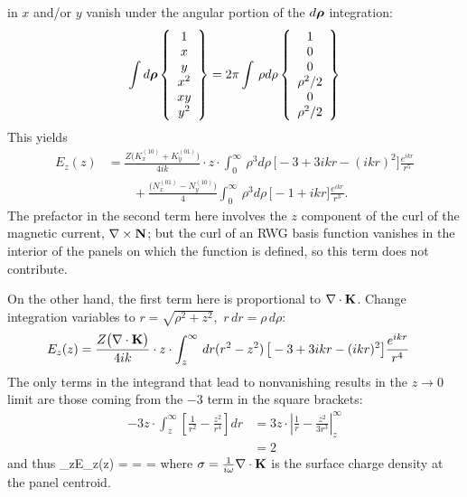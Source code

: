 \documentclass[letterpaper]{article}
\begin{document}
in $x$ and/or $y$ vanish under the angular portion of the $d\boldsymbol{\rho}$
integration:
$$ \int d\boldsymbol{\rho} 
   \left\{ \begin{array}{c} 1 \\ x \\ y \\ x^2 \\xy \\y^2 \end{array}
   \right\}
   =2\pi \int \, \rho d\rho 
   \left\{ \begin{array}{c} 1 \\ 0 \\ 0 \\ \rho^2/2 \\ 0 \\ \rho^2/2 \end{array}
   \right\}
$$
This yields
\begin{align*}
 E_z(z) 
&= \frac{Z \big( K_x^{(10)} + K_y^{(01)} \big)}{4ik}  
   \cdot z \cdot \int_0^\infty \, \rho^3 d\rho \, \big[-3 + 3ikr - (ikr)^2\big] 
   \frac{e^{ikr}}{r^5}
\\
&\qquad
 + \frac{\big( N_x^{(01)} - N_y^{(10)} \big)}{4}  
   \int_0^\infty \, \rho^3 d\rho \, \big[-1 + ikr ] 
   \frac{e^{ikr}}{r^3}.
\end{align*}
The prefactor in the second term here involves the $z$ component of the 
curl of the magnetic current, $\nabla \times \mathbf{N}$; but the curl of an 
RWG basis function vanishes in the interior of the panels on which the 
function is defined, so this term does not contribute.

On the other hand, the first term here is proportional to $\nabla \cdot \mathbf{K}$.
Change integration variables to 
$r=\sqrt{\rho^2 + z^2}, \,\, r\,dr = \rho\, d\rho:$
\begin{align*}
 E_z(z) 
&= \frac{Z \big (\nabla \cdot \mathbf{K} \big)}{4ik} 
   \cdot z \cdot \int_z^\infty \, dr (r^2 - z^2) \, \big[-3 + 3ikr - (ikr)^2\big] 
   \frac{e^{ikr}}{r^4}
\end{align*}
The only terms in the integrand that lead to nonvanishing results in the 
$z\to 0$ limit are those coming from the $-3$ term in the square brackets:
\begin{align*}
 -3z\cdot \int_z^\infty \left[ \frac{1}{r^2} - \frac{z^2}{r^4} \right]dr 
&=
  3z\cdot\left| \frac{1}{r} - \frac{z^2}{3r^3} \right|_{z}^\infty
\\
&=2
\end{align*}
and thus 
{
   \lim_{z}E_z(z) 
   =  
   =  
   = \frac{\sigma}{2\epsilon}
}
where $\sigma=\frac{1}{i\omega}\nabla \cdot \mathbf{K}$ is 
the surface charge density at the panel centroid. 
\end{document}
